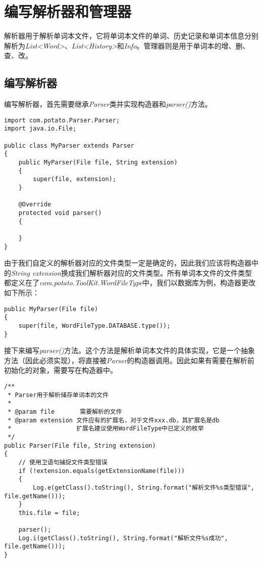 \section[解析器和管理器]{编写解析器和管理器}\label{sec:解析器和管理器}

解析器用于解析单词本文件，它将单词本文件的单词、历史记录和单词本信息分别解析为\emph{List<Word>}、\emph{List<History>}和\emph{Info}。管理器则是用于单词本的增、删、查、改。

\subsection[解析器]{编写解析器}\label{subsec:解析器}

编写解析器，首先需要继承\emph{Parser}类并实现构造器和\emph{parser()}方法。

\begin{lstlisting}[style=Java, caption={初始布局},label={lst:初始布局}]
import com.potato.Parser.Parser;
import java.io.File;

public class MyParser extends Parser
{
    public MyParser(File file, String extension)
    {
        super(file, extension);
    }

    @Override
    protected void parser()
    {

    }
}
\end{lstlisting}

由于我们自定义的解析器对应的文件类型一定是确定的，因此我们应该将构造器中的\emph{String extension}换成我们解析器对应的文件类型。所有单词本文件的文件类型都定义在了\emph{com.potato.ToolKit.WordFileType}中，我们以数据库为例，构造器更改如下所示：

\begin{lstlisting}[style=Java, caption={构造器},label={lst:构造器}]
public MyParser(File file)
{
    super(file, WordFileType.DATABASE.type());
}
\end{lstlisting}

接下来编写\emph{parser()}方法。这个方法是解析单词本文件的具体实现，它是一个抽象方法（因此必须实现），将直接被\emph{Parser}的构造器调用。因此如果有需要在解析前初始化的对象，需要写在构造器中。

\begin{lstlisting}[style=Java, caption={Parser的构造器源码},label={lst:Parser的构造器源码}]
/**
 * Parser用于解析储存单词本的文件
 *
 * @param file       需要解析的文件
 * @param extension 文件应有的扩展名，对于文件xxx.db，其扩展名是db
 *                  扩展名建议使用WordFileType中已定义的枚举
 */
public Parser(File file, String extension)
{
    // 使用卫语句捕捉文件类型错误
    if (!extension.equals(getExtensionName(file)))
    {
        Log.e(getClass().toString(), String.format("解析文件%s类型错误", file.getName()));
    }
    this.file = file;

    parser();
    Log.i(getClass().toString(), String.format("解析文件%s成功", file.getName()));
}
\end{lstlisting}

